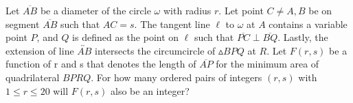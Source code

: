 Let $\overline{AB}$ be a diameter of the circle $\omega$ with radius $r$. Let point $C \ne A,B$ be on segment $\overline{AB}$ such that $AC = s$. The tangent line $\ell$ to $\omega$ at $A$ contains a variable point $P$, and $Q$ is defined as the point on $\ell$ such that $\overline{PC} \perp \overline{BQ}$. Lastly, the extension of line $\overleftrightarrow{AB}$ intersects the circumcircle of $\vartriangle BPQ$ at $R$. Let $F(r, s)$ be a function of r and s that denotes the length of $\overline{AP}$ for the minimum area of quadrilateral $BPRQ$. For how many ordered pairs of integers $(r, s)$ with $1 \le r \le  20$ will $F(r, s)$ also be an integer?
